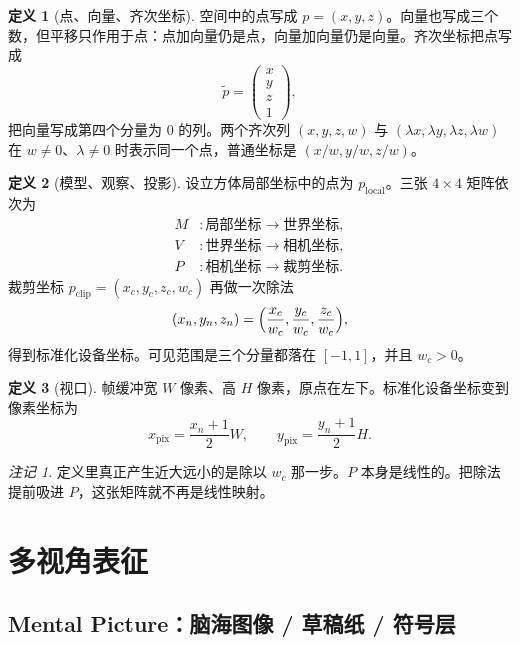\documentclass[12pt,a4paper]{article}
\theoremstyle{definition}
\newtheorem{definition}{定义}[section]
\theoremstyle{plain}
\theoremstyle{remark}
\newtheorem*{remark}{注记}
\begin{document}
\begin{definition}[点、向量、齐次坐标]
空间中的点写成 $p=(x,y,z)$。向量也写成三个数，但平移只作用于点：点加向量仍是点，向量加向量仍是向量。齐次坐标把点写成
\[
\tilde p=\begin{pmatrix}x\\y\\z\\1\end{pmatrix},
\]
把向量写成第四个分量为 $0$ 的列。两个齐次列 $(x,y,z,w)$ 与 $(\lambda x,\lambda y,\lambda z,\lambda w)$ 在 $w\neq 0$、$\lambda\neq 0$ 时表示同一个点，普通坐标是 $(x/w,y/w,z/w)$。
\end{definition}

\begin{definition}[模型、观察、投影]
设立方体局部坐标中的点为 $p_{\mathrm{local}}$。三张 $4\times 4$ 矩阵依次为
\begin{align*}
M&\colon \text{局部坐标}\to\text{世界坐标},\\
V&\colon \text{世界坐标}\to\text{相机坐标},\\
P&\colon \text{相机坐标}\to\text{裁剪坐标}.
\end{align*}
裁剪坐标 $p_{\mathrm{clip}}=(x_c,y_c,z_c,w_c)$ 再做一次除法
\[
(x_n,y_n,z_n)=\Bigl(\frac{x_c}{w_c},\frac{y_c}{w_c},\frac{z_c}{w_c}\Bigr),
\]
得到标准化设备坐标。可见范围是三个分量都落在 $[-1,1]$，并且 $w_c>0$。
\end{definition}

\begin{definition}[视口]
帧缓冲宽 $W$ 像素、高 $H$ 像素，原点在左下。标准化设备坐标变到像素坐标为
\begin{equation}
x_{\mathrm{pix}}=\frac{x_n+1}{2}W,\qquad
y_{\mathrm{pix}}=\frac{y_n+1}{2}H.
\label{eq:viewport}
\end{equation}
\end{definition}

\begin{remark}
定义里真正产生近大远小的是除以 $w_c$ 那一步。$P$ 本身是线性的。把除法提前吸进 $P$，这张矩阵就不再是线性映射。
\end{remark}

\section{多视角表征}

\subsection{Mental Picture：脑海图像 / 草稿纸 / 符号层}
\end{document}
